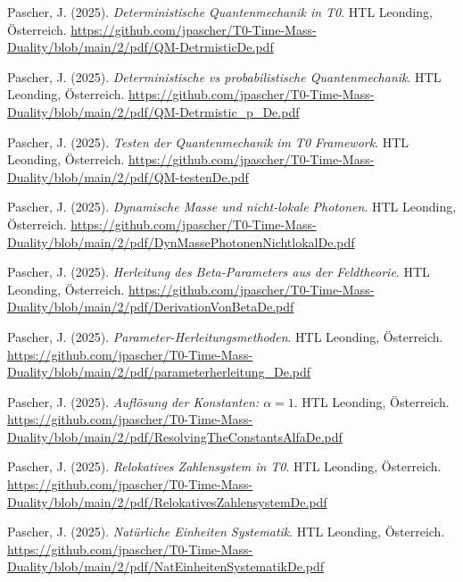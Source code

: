 \documentclass{article}
\begin{document}
\begin{thebibliography}{99}
		Pascher, J. (2025).
		\textit{Deterministische Quantenmechanik in T0}.
		HTL Leonding, Österreich.
		\url{https://github.com/jpascher/T0-Time-Mass-Duality/blob/main/2/pdf/QM-DetrmisticDe.pdf}
		
		Pascher, J. (2025).
		\textit{Deterministische vs probabilistische Quantenmechanik}.
		HTL Leonding, Österreich.
		\url{https://github.com/jpascher/T0-Time-Mass-Duality/blob/main/2/pdf/QM-Detrmistic_p_De.pdf}
		
		Pascher, J. (2025).
		\textit{Testen der Quantenmechanik im T0 Framework}.
		HTL Leonding, Österreich.
		\url{https://github.com/jpascher/T0-Time-Mass-Duality/blob/main/2/pdf/QM-testenDe.pdf}
		
		Pascher, J. (2025).
		\textit{Dynamische Masse und nicht-lokale Photonen}.
		HTL Leonding, Österreich.
		\url{https://github.com/jpascher/T0-Time-Mass-Duality/blob/main/2/pdf/DynMassePhotonenNichtlokalDe.pdf}
		
		
		Pascher, J. (2025).
		\textit{Herleitung des Beta-Parameters aus der Feldtheorie}.
		HTL Leonding, Österreich.
		\url{https://github.com/jpascher/T0-Time-Mass-Duality/blob/main/2/pdf/DerivationVonBetaDe.pdf}
		
		Pascher, J. (2025).
		\textit{Parameter-Herleitungsmethoden}.
		HTL Leonding, Österreich.
		\url{https://github.com/jpascher/T0-Time-Mass-Duality/blob/main/2/pdf/parameterherleitung_De.pdf}
		
		Pascher, J. (2025).
		\textit{Auflösung der Konstanten: $\alpha = 1$}.
		HTL Leonding, Österreich.
		\url{https://github.com/jpascher/T0-Time-Mass-Duality/blob/main/2/pdf/ResolvingTheConstantsAlfaDe.pdf}
		
		Pascher, J. (2025).
		\textit{Relokatives Zahlensystem in T0}.
		HTL Leonding, Österreich.
		\url{https://github.com/jpascher/T0-Time-Mass-Duality/blob/main/2/pdf/RelokativesZahlensystemDe.pdf}
		
		Pascher, J. (2025).
		\textit{Natürliche Einheiten Systematik}.
		HTL Leonding, Österreich.
		\url{https://github.com/jpascher/T0-Time-Mass-Duality/blob/main/2/pdf/NatEinheitenSystematikDe.pdf}
		

\end{thebibliography}
\end{document}
